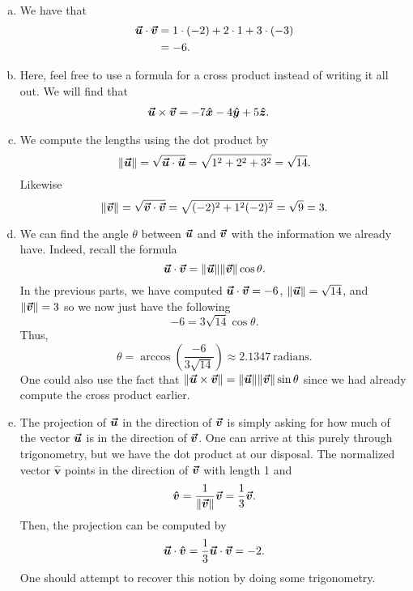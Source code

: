 \documentclass[12pt]{article} %
\newcommand{\vhat}{\boldsymbol{\hat{v}}}
\begin{document}
\begin{solution}~
\begin{enumerate}[(a)]
    \item We have that
    \begin{align*}
        \boldsymbol{\vec{u}} \cdot \boldsymbol{\vec{v}} &= 1\cdot (-2) + 2 \cdot 1 + 3 \cdot (-3)\\
        &= -6.
    \end{align*}
    \item Here, feel free to use a formula for a cross product instead of writing it all out.  We will find that
    \begin{align*}
        \boldsymbol{\vec{u}} \times \boldsymbol{\vec{v}} &= -7\boldsymbol{\hat{x}} -4\boldsymbol{\hat{y}} +5\boldsymbol{\hat{z}}.
    \end{align*}
    \item We compute the lengths using the dot product by
    \[
        \|\boldsymbol{\vec{u}}\| = \sqrt{\boldsymbol{\vec{u}} \cdot \boldsymbol{\vec{u}}} = \sqrt{1^2+2^2+3^2} = \sqrt{14}.
    \]
    Likewise
    \[
        \|\boldsymbol{\vec{v}}\| = \sqrt{\boldsymbol{\vec{v}} \cdot \boldsymbol{\vec{v}}} = \sqrt{(-2)^2 + 1^2 (-2)^2} = \sqrt{9} = 3.
    \]
    \item We can find the angle $\theta$ between $\boldsymbol{\vec{u}}$ and $\boldsymbol{\vec{v}}$ with the information we already have.  Indeed, recall the formula
    \[
        \boldsymbol{\vec{u}} \cdot \boldsymbol{\vec{v}} = \|\boldsymbol{\vec{u}} \| \|\boldsymbol{\vec{v}}\| \cos \theta.
    \]
    In the previous parts, we have computed $\boldsymbol{\vec{u}} \cdot \boldsymbol{\vec{v}} = -6$, $\|\boldsymbol{\vec{u}}\|=\sqrt{14}$, and $\|\boldsymbol{\vec{v}}\|=3$ so we now just have the following
    \[
        -6 = 3\sqrt{14} \cos \theta.
    \]
    Thus,
    \[
        \theta = \arccos\left(\frac{-6}{3\sqrt{14}}\right) \approx 2.1347 ~\textrm{radians}.
    \]
    One could also use the fact that $\|\boldsymbol{\vec{u}} \times \boldsymbol{\vec{v}}\| = \|\boldsymbol{\vec{u}}\| \|\boldsymbol{\vec{v}}\| \sin \theta$ since we had already compute the cross product earlier. 
    \item The projection of $\boldsymbol{\vec{u}}$ in the direction of $\boldsymbol{\vec{v}}$ is simply asking for how much of the vector $\boldsymbol{\vec{u}}$ is in the direction of $\boldsymbol{\vec{v}}$.  One can arrive at this purely through trigonometry, but we have the dot product at our disposal.  The normalized vector $\vhat$ points in the direction of $\boldsymbol{\vec{v}}$ with length 1 and
    \[
        \vhat = \frac{1}{\|\vecv\|} \vecv = \frac{1}{3} \vecv.
    \]
    Then, the projection can be computed by
    \[
        \vecu \cdot \vhat = \frac{1}{3} \vecu \cdot \vecv = -2.
    \]
    One should attempt to recover this notion by doing some trigonometry. 
\end{enumerate}
\end{solution}
\end{document}
